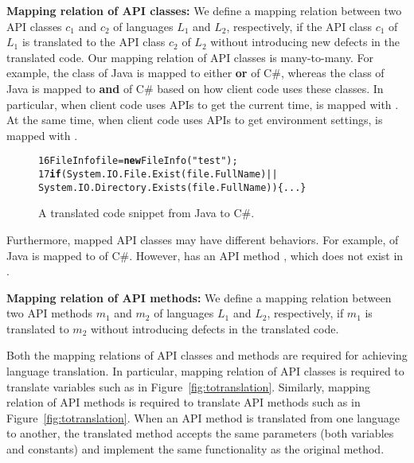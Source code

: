 \textbf{Mapping relation of API classes:} We define a mapping
relation between two API classes $c_1$ and $c_2$ of languages $L_1$
and $L_2$, respectively, if the API class $c_1$ of $L_1$ is
translated to the API class $c_2$ of $L_2$ without introducing new
defects in the translated code. Our mapping relation of API classes
is many-to-many. For example, the  class
of Java is mapped to either 
\textbf{or}  of C\#,
whereas the  class of Java is mapped to
 \textbf{and}  of
C\# based on how client code uses these classes. In particular, when
client code uses APIs to get the current time,
 is mapped with .
At the same time, when client code uses APIs to get environment
settings,  is mapped with
.
\begin{figure}[t]
\begin{CodeOut}\vspace*{-1ex}
\begin{alltt}
16  FileInfo file = \textbf{new} FileInfo("test");
17   \textbf{if}(System.IO.File.Exist(file.FullName)||
       System.IO.Directory.Exists(file.FullName))\{...\}
\end{alltt}
\end{CodeOut}\vspace*{-4ex}
\caption{\label{fig:translatedcode} A translated code snippet from
Java to C\#.}\vspace*{-3ex}
\end{figure}

Furthermore, mapped API classes may have different behaviors. For
example,  of Java is mapped to
 of C\#. However,  has
an API method , which does not exist in
.

\textbf{Mapping relation of API methods:} We define a mapping relation
between two API methods $m_1$ and $m_2$ of languages $L_1$ and $L_2$,
respectively, if $m_1$ is translated to $m_2$ without introducing defects
in the translated code.

Both the mapping relations of API classes and methods are required
for achieving language translation. In particular, mapping relation
of API classes is required to translate variables such as
 in Figure~\ref{fig:totranslation}. Similarly, mapping
relation of API methods is required to translate API methods such as
 in Figure~\ref{fig:totranslation}. When an API
method is translated from one language to another, the translated
method accepts the same parameters (both variables and constants)
and implement the same functionality as the original method.

